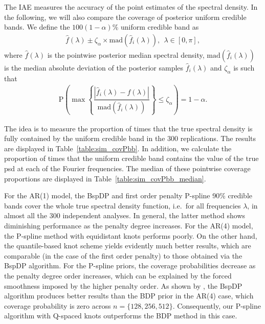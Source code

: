 \documentclass[twocolumn,final]{svjour3}
\begin{document}

The IAE measures the accuracy of the  point estimates of the spectral density. In the following, we will also compare the coverage of posterior uniform credible bands.
We define the $100(1-\alpha)\%$ uniform credible band as
\begin{align*}
\widehat{f}(\lambda) \pm \zeta_\alpha \times \text{mad} \left( \widehat{f}_i (\lambda) \right), \:\: \lambda \in [0,\pi],
\end{align*}
where $\widehat{f}(\lambda)$ is the pointwise posterior median spectral density, $\text{mad}( \widehat{f}_i (\lambda))$ is the median absolute deviation of the posterior samples $\widehat{f}_i (\lambda)$ and $\zeta_\alpha$ is such that
\begin{align*}
\text{P}\left( \max \left\{ \dfrac{|\widehat{f}_i (\lambda) - \widehat{f} (\lambda)|}{\text{mad}(\widehat{f}_i (\lambda))} \right\} \leq \zeta_{\alpha} \right) = 1 - \alpha.
\end{align*}

The idea is to measure the proportion of times that the true spectral density is fully contained by the uniform credible band in the 300 replications.  The results are displayed in Table~\ref{table:sim_covPbb}.  In addition, we calculate the proportion of times that the uniform credible band contains the value of the true psd
at each of the Fourier frequencies.  The median of these pointwise coverage proportions are displayed in Table~\ref{table:sim_covPbb_median}.

For the AR(1) model, the BspDP and first order penalty P-spline 90\% credible bands cover the whole true spectral density function, i.e.\ for all frequencies $\lambda$, in 
almost all the 300 independent analyses.  In general, the latter method shows diminishing  performance as the penalty degree increases.  For the AR(4) model, the P-spline method with equidistant knots performs poorly.  On the other hand, the quantile-based knot scheme yields evidently much better results, which are comparable (in the case of the first order penalty) to those obtained via the BspDP algorithm.  %
For the P-spline priors, the coverage probabilities decrease as the penalty degree order increases, which can be explained by the forced smoothness imposed by the higher penalty order.  As shown by \cite{Edwards2019}, the BspDP algorithm produces better results than the BDP prior in the AR(4) case, which coverage probability is zero across $n=\{128,256,512\}$. Consequently, our P-spline algorithm with Q-spaced knots outperforms the BDP method in this case.
\end{document}
